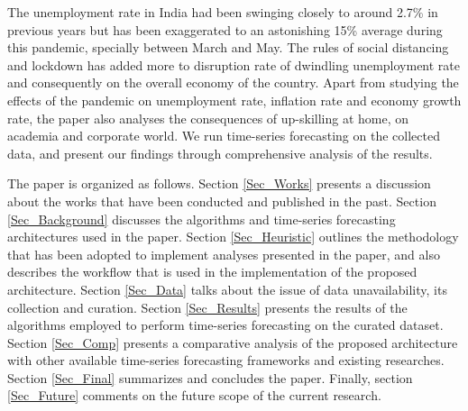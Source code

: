 \documentclass[times,twocolumn,final,authoryear]{elsarticle}
\begin{document}
	The unemployment rate in India had been swinging closely to around 2.7\% in previous years but has been exaggerated to an astonishing 15\% average during this pandemic, specially between March and May. The rules of social distancing and lockdown has added more to disruption rate of dwindling unemployment rate and consequently on the overall economy of the country. Apart from studying the effects of the pandemic on unemployment rate, inflation rate and economy growth rate, the paper also analyses the consequences of up-skilling at home, on academia and corporate world.  We run time-series forecasting on the collected data, and present our findings through comprehensive analysis of the results.
	
	The paper is organized as follows. Section \ref{Sec_Works} presents a discussion about the works that have been conducted and published in the past. Section \ref{Sec_Background} discusses the algorithms and time-series forecasting architectures used in the paper. Section \ref{Sec_Heuristic} outlines the methodology that has been adopted to implement analyses presented in the paper, and also describes the workflow that is used in the implementation of the proposed architecture. Section \ref{Sec_Data} talks about the issue of data unavailability, its collection and curation. Section \ref{Sec_Results} presents the results of the algorithms employed to perform time-series forecasting on the curated dataset. Section \ref{Sec_Comp} presents a comparative analysis of the proposed architecture with other available time-series forecasting frameworks and existing researches. Section \ref{Sec_Final} summarizes and concludes the paper. Finally, section \ref{Sec_Future} comments on the future scope of the current research.
	
	
\end{document}
